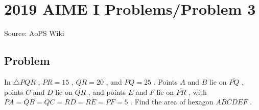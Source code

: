 \documentclass[12pt]{article}
\begin{document}
\section*{{2019 AIME I Problems/Problem 3}}
Source: AoPS Wiki

\subsection*{Problem}
In $\triangle PQR$ , $PR=15$ , $QR=20$ , and $PQ=25$ . Points $A$ and $B$ lie on $\overline{PQ}$ , points $C$ and $D$ lie on $\overline{QR}$ , and points $E$ and $F$ lie on $\overline{PR}$ , with $PA=QB=QC=RD=RE=PF=5$ . Find the area of hexagon $ABCDEF$ .
\end{document}
